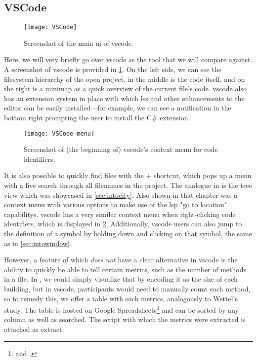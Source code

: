 \documentclass[../thesis]{subfiles}
\begin{document}
\subsection{VSCode}\label{subsec:vscode}

\begin{figure}
	\begin{center}
		\texttt{[image: VSCode]}
	\end{center}
	\caption{Screenshot of the main \gls{ui} of \gls{vscode}.}\label{fig:vscode}
\end{figure}

Here, we will very briefly go over \gls{vscode} as the tool that we will compare \SEE{} against.
A screenshot of \gls{vscode} is provided in \cref{fig:vscode}.
On the left side, we can see the filesystem hierarchy of the open project, in the middle is the code itself, and on the right is a minimap as a quick overview of the current file's code.
\gls{vscode} also has an extension system in place with which \glspl{ls} and other enhancements to the editor can be easily installed---for example, we can see a notification in the bottom right prompting the user to install the C\# extension.

\begin{figure}
	\begin{center}
		\texttt{[image: VSCode-menu]}
	\end{center}
	\caption{Screenshot of (the beginning of) \gls{vscode}'s context menu for code identifiers.}\label{fig:vscode_menu}
\end{figure}

It is also possible to quickly find files with the  +  shortcut, which pops up a menu with a live search through all filenames in the project.
The analogue in \SEE{} is the tree view which was showcased in \cref{sec:intocity}.
Also shown in that chapter was a context menu with various options to make use of the \gls{lsp} "go to location" \glspl{capability}.
\Gls{vscode} has a very similar context menu when right-clicking code identifiers, which is displayed in \cref{fig:vscode_menu}.
Additionally, \gls{vscode} users can also jump to the definition of a symbol by holding down  and clicking on that symbol, the same as in \cref{sec:intowindow}.

However, a feature of \SEE{} which \emph{does not} have a clear alternative in \gls{vscode} is the ability to quickly be able to tell certain metrics, such as the number of methods in a file.
In \SEE{}, we could simply visualize that by encoding it as the size of each building, but in \gls{vscode}, participants would need to manually count each method, so to remedy this, we offer a table with such metrics, analogously to Wettel's study.
The table is hosted on Google Spreadsheets\footnote{
	 and .
} and can be sorted by any column as well as searched.
The script with which the metrics were extracted is attached as \gls{extract}.
\end{document}
